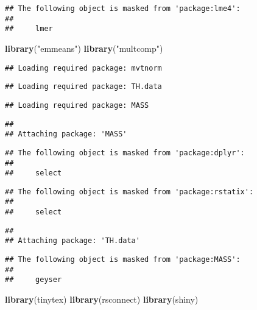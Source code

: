 \documentclass[
]{article}
\newenvironment{Shaded}{\begin{snugshade}}{\end{snugshade}}
\newcommand{\KeywordTok}[1]{\textcolor[rgb]{0.13,0.29,0.53}{\textbf{#1}}}
\newcommand{\NormalTok}[1]{#1}
\newcommand{\StringTok}[1]{\textcolor[rgb]{0.31,0.60,0.02}{#1}}
\begin{document}
\begin{verbatim}
## The following object is masked from 'package:lme4':
## 
##     lmer
\end{verbatim}

\begin{Shaded}
\begin{Highlighting}[]
\KeywordTok{library}\NormalTok{(}\StringTok{"emmeans"}\NormalTok{)  }
\KeywordTok{library}\NormalTok{(}\StringTok{"multcomp"}\NormalTok{) }
\end{Highlighting}
\end{Shaded}

\begin{verbatim}
## Loading required package: mvtnorm
\end{verbatim}

\begin{verbatim}
## Loading required package: TH.data
\end{verbatim}

\begin{verbatim}
## Loading required package: MASS
\end{verbatim}

\begin{verbatim}
## 
## Attaching package: 'MASS'
\end{verbatim}

\begin{verbatim}
## The following object is masked from 'package:dplyr':
## 
##     select
\end{verbatim}

\begin{verbatim}
## The following object is masked from 'package:rstatix':
## 
##     select
\end{verbatim}

\begin{verbatim}
## 
## Attaching package: 'TH.data'
\end{verbatim}

\begin{verbatim}
## The following object is masked from 'package:MASS':
## 
##     geyser
\end{verbatim}

\begin{Shaded}
\begin{Highlighting}[]
\KeywordTok{library}\NormalTok{(tinytex)}
\KeywordTok{library}\NormalTok{(rsconnect)}
\KeywordTok{library}\NormalTok{(shiny)}
\end{Highlighting}
\end{Shaded}
\end{document}
